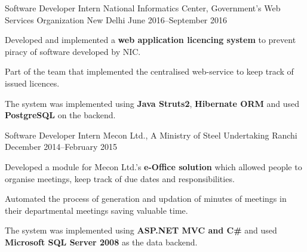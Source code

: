 
\begin{cventries}

\cventry%
  {Software Developer Intern} %
  {National Informatics Center, Government's Web Services Organization} %
  {New Delhi} %
  {June 2016--September 2016} %
  {%
    \begin{cvitems} %
      \item{Developed and implemented a \textbf{web application licencing system}
            to prevent piracy of software developed by NIC.}
      \item{Part of the team that implemented the centralised web-service to
            keep track of issued licences.}
      \item{The system was implemented using \textbf{Java Struts2},
            \textbf{Hibernate ORM} and used \textbf{PostgreSQL} on the backend.}
    \end{cvitems}
  }

\cventry%
  {Software Developer Intern} %
  {Mecon Ltd., A Ministry of Steel Undertaking} %
  {Ranchi} %
  {December 2014--February 2015} %
  {%
    \begin{cvitems} %
      \item{Developed a module for Mecon Ltd.'s \textbf{e-Office solution} which
            allowed people to organise meetings, keep track of due dates
            and responsibilities.}
      \item{Automated the process of generation and updation of minutes of
            meetings in their departmental meetings saving valuable time.}
      \item{The system was implemented using \textbf{ASP.NET MVC and C\#} and
            used \textbf{Microsoft SQL Server 2008} as the data backend.}
    \end{cvitems}
  }

\end{cventries}
